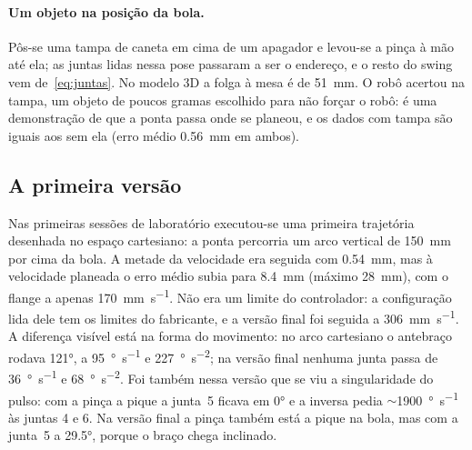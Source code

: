 \paragraph{Um objeto na posição da bola.} Pôs-se uma tampa de caneta em cima
de um apagador e levou-se a pinça à mão até ela; as juntas lidas nessa pose
passaram a ser o endereço, e o resto do swing vem de~\eqref{eq:juntas}. No
modelo 3D a folga à mesa é de \SI{51}{\milli\meter}. O robô acertou na
tampa, um objeto de poucos gramas escolhido para não forçar o robô: é uma
demonstração de que a ponta passa onde se planeou, e os dados com tampa são
iguais aos sem ela (erro médio \SI{0.56}{\milli\meter} em ambos).

\subsection{A primeira versão}
\label{sec:v1}

Nas primeiras sessões de laboratório executou-se uma primeira trajetória
desenhada no
espaço cartesiano: a ponta percorria um arco vertical de
\SI{150}{\milli\meter} por cima da bola. A metade da velocidade era seguida
com \SI{0.54}{\milli\meter}, mas à velocidade planeada o erro médio subia
para \SI{8.4}{\milli\meter} (máximo \SI{28}{\milli\meter}), com o flange a
apenas \SI{170}{\milli\meter\per\second}. Não era um limite do controlador:
a configuração lida dele tem os limites do fabricante, e a versão final foi
seguida a \SI{306}{\milli\meter\per\second}. A diferença visível está na
forma do movimento: no arco cartesiano o antebraço rodava \ang{121}, a
\SI{95}{\degree\per\second} e \SI{227}{\degree\per\second\squared}; na
versão final nenhuma junta passa de \SI{36}{\degree\per\second} e
\SI{68}{\degree\per\second\squared}. Foi também nessa versão que se viu a
singularidade do pulso: com a pinça a pique a junta~5 ficava em \ang{0} e a
inversa pedia $\sim$\SI{1900}{\degree\per\second} às juntas 4 e 6. Na versão
final a pinça também está a pique na bola, mas com a junta~5 a \ang{29.5},
porque o braço chega inclinado.
